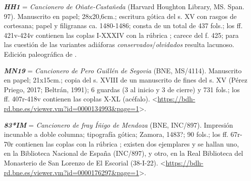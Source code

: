 \documentclass[11pt,twoside]{article}
\newcommand{\hh}{\emph{\textbf{HH1}}}
\newcommand{\mn}{\emph{\textbf{MN19}}}
\newcommand{\im}{\emph{\textbf{83*IM}}}
\begin{document}
%
{\hh} = \emph{Cancionero de Oñate-Castañeda} (Harvard Houghton Library, MS. Span. 97).
%
Manuscrito en papel; 28x20,6cm.; escritura gótica del s. XV con rasgos de cortesana; papel y filigranas ca. 1480-1486; consta de un total de 437 fols.; los ff. 421v-424v contienen las coplas I-XXXIV con la rúbrica ; carece del f. 425; para las cuestión de las variantes adiáforas \emph{conservados}/\emph{olvidados} resulta lacunoso. Edición paleográfica de \textcite{Severin1990}.\par
%
{\mn} = \emph{Cancionero de Pero Guillén de Segovia} (BNE, MS/4114).
%
Manuscrito en papel; 21x15cm.; copia del s. XVIII de un manuscrito de fines del s. XV (Pérez Priego, 2017; Beltrán, 1991); 6 guardas (3 al inicio y 3 de cierre) y 731 fols.; los ff. 407r-418v contienen las coplas X-XL (acéfalo). <\url{https://bdh-rd.bne.es/viewer.vm?id=0000134993\&page=1}>.\par
%
{\im} = \emph{Cancionero de fray Íñigo de Mendoza} (BNE, INC/897).
%
Impresión incunable a doble columna; tipografía gótica; Zamora, 1483?; 90 fols.; los ff. 67r-70r contienen las coplas con la rúbrica ; existen dos ejemplares y se hallan uno, en la Biblioteca Nacional de España (INC/897), y otro, en la Real Biblioteca del Monasterio de San Lorenzo de El Escorial (38-I-22). <\url{https://bdh-rd.bne.es/viewer.vm?id=0000176297\&page=1}>.\par
%
\end{document}
